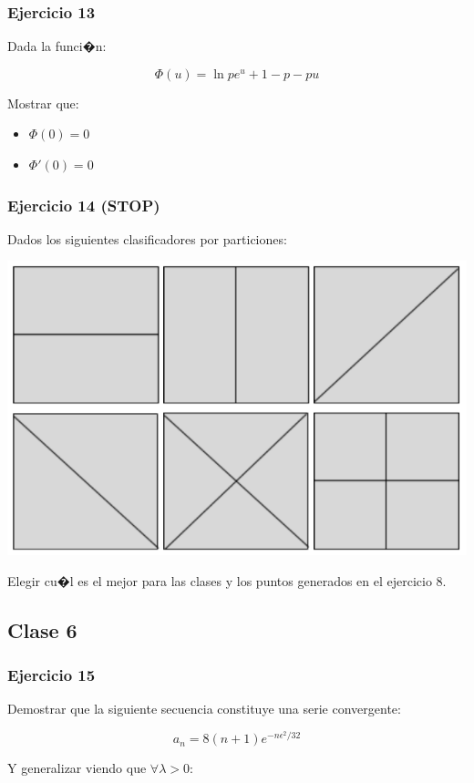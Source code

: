 \documentclass[a4paper,10pt]{article}
\begin{document}
	\subsubsection{Ejercicio 13}
	
	Dada la funci�n:
	
	$$ \Phi(u) = \ln{p e^u +1 -p} - pu$$
	
	Mostrar que:
	
	\begin{itemize}
		\item $\Phi(0) = 0$
		\item $\Phi'(0) = 0$
		
		
	\end{itemize}
	
	\subsubsection{Ejercicio 14 (STOP)}
	
	Dados los siguientes clasificadores por particiones:
	
	\begin{center}
		\includegraphics[width=0.5\linewidth]{enunciado-ej14}
		\label{fig:enunciado-ej14}\\
	\end{center}
	
	Elegir cu�l es el mejor para las clases y los puntos generados en el ejercicio 8.
	
	\subsection{Clase 6}
	
	\subsubsection{Ejercicio 15}
	
	Demostrar que la siguiente secuencia constituye una serie convergente:
	
	$$a_n = 8(n+1) e^{-n\epsilon^2/32}$$
	
	Y generalizar viendo que $\forall \lambda >0$:
	
\end{document}
